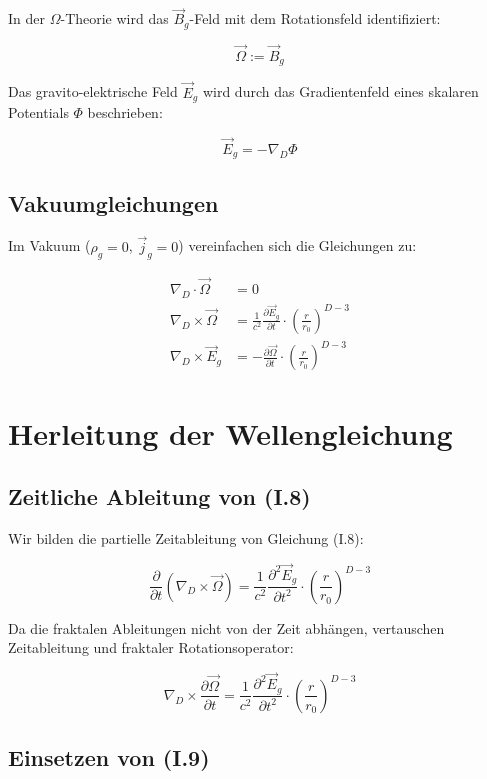 In der $\Omega$-Theorie wird das $\vec{B}_g$-Feld mit dem Rotationsfeld identifiziert:

\[
\vec{\Omega} := \vec{B}_g \tag{I.5}
\]

Das gravito-elektrische Feld $\vec{E}_g$ wird durch das Gradientenfeld eines skalaren 
Potentials $\Phi$ beschrieben:

\[
\vec{E}_g = -\nabla_D \Phi \tag{I.6}
\]

\subsection{Vakuumgleichungen}

Im Vakuum ($\rho_g = 0$, $\vec{j}_g = 0$) vereinfachen sich die Gleichungen zu:

\begin{align}
\nabla_D \cdot \vec{\Omega} &= 0 \tag{I.7} \\
\nabla_D \times \vec{\Omega} &= \frac{1}{c^2} \frac{\partial \vec{E}_g}{\partial t} \cdot \left(\frac{r}{r_0}\right)^{D-3} \tag{I.8} \\
\nabla_D \times \vec{E}_g &= -\frac{\partial \vec{\Omega}}{\partial t} \cdot \left(\frac{r}{r_0}\right)^{D-3} \tag{I.9}
\end{align}

\section{Herleitung der Wellengleichung}

\subsection{Zeitliche Ableitung von (I.8)}

Wir bilden die partielle Zeitableitung von Gleichung (I.8):

\[
\frac{\partial}{\partial t} (\nabla_D \times \vec{\Omega}) = \frac{1}{c^2} \frac{\partial^2 \vec{E}_g}{\partial t^2} \cdot \left(\frac{r}{r_0}\right)^{D-3}
\]

Da die fraktalen Ableitungen nicht von der Zeit abhängen, vertauschen Zeitableitung 
und fraktaler Rotationsoperator:

\[
\nabla_D \times \frac{\partial \vec{\Omega}}{\partial t} = \frac{1}{c^2} \frac{\partial^2 \vec{E}_g}{\partial t^2} \cdot \left(\frac{r}{r_0}\right)^{D-3} \tag{I.10}
\]

\subsection{Einsetzen von (I.9)}

